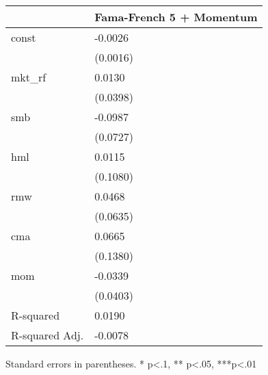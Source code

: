 \begin{table}
\caption{}
\label{}
\begin{center}
\begin{tabular}{ll}
\hline
               & Fama-French 5 + Momentum  \\
\hline
const          & -0.0026                   \\
               & (0.0016)                  \\
mkt\_rf        & 0.0130                    \\
               & (0.0398)                  \\
smb            & -0.0987                   \\
               & (0.0727)                  \\
hml            & 0.0115                    \\
               & (0.1080)                  \\
rmw            & 0.0468                    \\
               & (0.0635)                  \\
cma            & 0.0665                    \\
               & (0.1380)                  \\
mom            & -0.0339                   \\
               & (0.0403)                  \\
R-squared      & 0.0190                    \\
R-squared Adj. & -0.0078                   \\
\hline
\end{tabular}
\end{center}
\end{table}
\bigskip
Standard errors in parentheses. \newline 
* p<.1, ** p<.05, ***p<.01